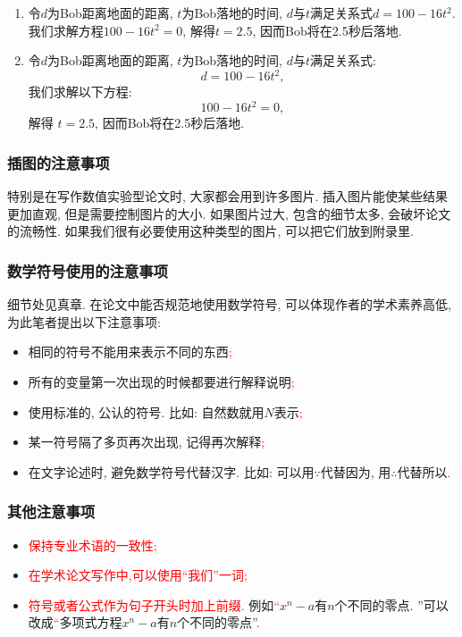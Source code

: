 \documentclass{formatBook}
\newcommand{\XG}[1]{\textcolor{red}{#1}}
\begin{document}
\begin{itemize}
          \begin{enumerate}
              \item 令$d$为Bob距离地面的距离, $t$为Bob落地的时间, $d$与$t$满足关系式$d = 100 − 16t^{2}$. 我们求解方程$100 − 16t^{2} = 0$, 解得$t =2.5$, 因而Bob将在2.5秒后落地.
              \item 令$d$为Bob距离地面的距离, $t$为Bob落地的时间, $d$与$t$满足关系式:
                    \begin{equation*}
                        d = 100 − 16t^{2},
                    \end{equation*}
                    我们求解以下方程:
                    \begin{equation*}
                        100 − 16t^{2} =0,
                    \end{equation*}
                    解得 $t =2.5$, 因而Bob将在2.5秒后落地.
          \end{enumerate}
\end{itemize}
\subsubsection{插图的注意事项}
特别是在写作数值实验型论文时, 大家都会用到许多图片. 插入图片能使某些结果更加直观, 但是需要控制图片的大小. 如果图片过大, 包含的细节太多, 会破坏论文的流畅性. 如果我们很有必要使用这种类型的图片, 可以把它们放到附录里.
\subsubsection{数学符号使用的注意事项}
细节处见真章. 在论文中能否规范地使用数学符号, 可以体现作者的学术素养高低, 为此笔者提出以下注意事项:
\begin{itemize}
    \item 相同的符号不能用来表示不同的东西\XG{;}
    \item 所有的变量第一次出现的时候都要进行解释说明\XG{;}
    \item 使用标准的, 公认的符号. 比如: 自然数就用$N$表示\XG{;}
    \item 某一符号隔了多页再次出现, 记得再次解释\XG{;}
    \item 在文字论述时, 避免数学符号代替汉字. 比如: 可以用$\because$代替因为, 用$\therefore$代替所以\XG{.}
\end{itemize}
\subsubsection{其他注意事项}
\begin{itemize}
    \item \XG{保持专业术语的一致性}\XG{;}
    \item \XG{在学术论文写作中,可以使用\XG{``}我们''一词}\XG{;}
    \item \XG{符号或者公式作为句子开头时加上前缀.} 例如\XG{``}$x^{n}-a$有$n$个不同的零点. ''可以改成\XG{``}多项式方程$x^{n}-a$有$n$个不同的零点''\XG{.}
\end{itemize}
\end{document}
